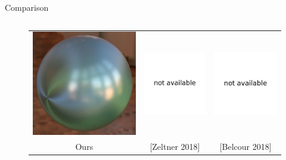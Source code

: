 \documentclass[final]{beamer}
\newlength{\onecolwid}
\newlength{\twocolwid}
\begin{document}
\begin{frame}[t]
\begin{columns}[t]
\begin{column}{\twocolwid}
\begin{block}{Comparison}
\begin{columns}[t,totalwidth=\twocolwid]
\begin{column}{\onecolwid}
\begin{figure}
\begin{tabular}{ccc}
                    	    \includegraphics[width=0.32\columnwidth]{validations/compare2/sphere_1024spp_60min.jpg} &
                    	    \includegraphics[width=0.32\columnwidth]{validations/compare2/na.pdf} &
                    	    \includegraphics[width=0.32\columnwidth]{validations/compare2/na.pdf} \\
                    
                    	    \small{Ours} &
                    	    \small{[Zeltner 2018]} &
                    	    \small{[Belcour 2018]}
                    	\end{tabular}
                    \end{figure}
                \end{column}
            

\end{columns}
\end{block}
\end{column}
\end{columns}
\end{frame}
\end{document}

